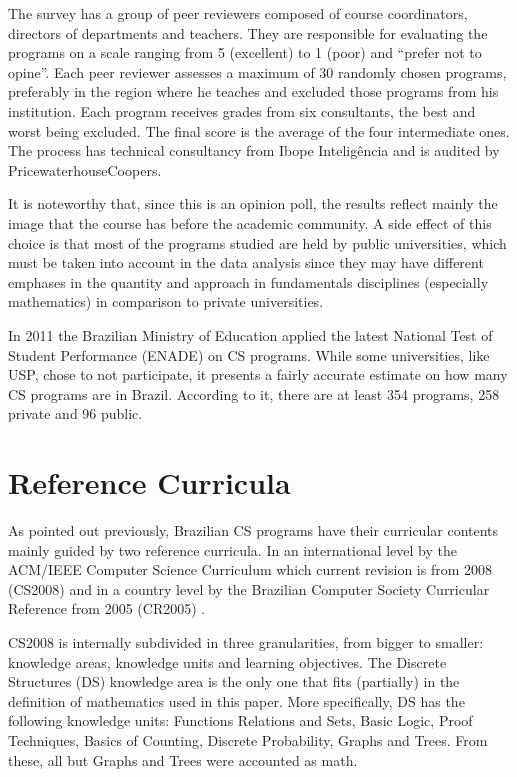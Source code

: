 \documentclass[conference]{IEEEtran}
\begin{document}
	The survey has a group of peer reviewers composed of course coordinators, directors of departments and teachers. They are responsible for evaluating the programs on a scale ranging from 5 (excellent) to 1 (poor) and ``prefer not to opine''. Each peer reviewer assesses a maximum of 30 randomly chosen programs, preferably in the region where he teaches and excluded those programs from his institution. Each program receives grades from six consultants, the best and worst being excluded. The final score is the average of the four intermediate ones. The process has technical consultancy from Ibope Inteligência and is audited by PricewaterhouseCoopers.
	
	It is noteworthy that, since this is an opinion poll, the results reflect mainly the image that the course has before the academic community. A side effect of this choice is that most of the programs studied are held by public universities, which must be taken into account in the data analysis since they may have different emphases in the quantity and approach in fundamentals disciplines (especially mathematics) in comparison to private universities.
	
	In 2011 the Brazilian Ministry of Education applied the latest National Test of Student Performance (ENADE) on CS programs. While some universities, like USP, chose to not participate, it presents a fairly accurate estimate on how many CS programs are in Brazil. According to it, there are at least 354 programs, 258 private and 96 public. \cite{enade} 


\section{Reference Curricula}
	As pointed out previously, Brazilian CS programs have their curricular contents mainly guided by two reference curricula. In an international level by the ACM/IEEE Computer Science Curriculum which current revision is from 2008 (CS2008) \cite{cs2008} and in a country level by the Brazilian Computer Society Curricular Reference from 2005 (CR2005) \cite{sbc}.

	CS2008 is internally subdivided in three granularities, from bigger to smaller: knowledge areas, knowledge units and learning objectives. The Discrete Structures (DS) knowledge area is the only one that fits (partially) in the definition of mathematics used in this paper. More specifically, DS has the following knowledge units: Functions Relations and Sets, Basic Logic, Proof Techniques, Basics of Counting, Discrete Probability, Graphs and Trees. From these, all but Graphs and Trees were accounted as math.
\end{document}
